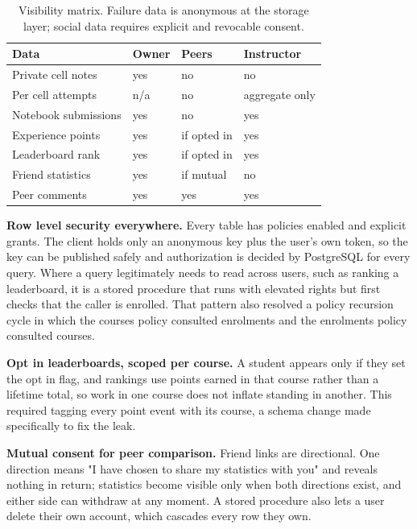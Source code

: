\documentclass[manuscript]{acmart}
\begin{document}
\begin{table}[t]
\caption{Visibility matrix. Failure data is anonymous at the storage layer;
social data requires explicit and revocable consent.}
\label{tab:visibility}
\centering\small
\begin{tabular}{@{}p{44mm}p{26mm}p{26mm}p{30mm}@{}}
\toprule
\textbf{Data} & \textbf{Owner} & \textbf{Peers} & \textbf{Instructor} \\
\midrule
Private cell notes      & yes & no & no \\
Per cell attempts       & n/a & no & aggregate only \\
Notebook submissions    & yes & no & yes \\
Experience points       & yes & if opted in & yes \\
Leaderboard rank        & yes & if opted in & yes \\
Friend statistics       & yes & if mutual & no \\
Peer comments           & yes & yes & yes \\
\bottomrule
\end{tabular}
\end{table}

\textbf{Row level security everywhere.} Every table has policies enabled and
explicit grants. The client holds only an anonymous key plus the user's own
token, so the key can be published safely and authorization is decided by
PostgreSQL for every query. Where a query legitimately needs to read across
users, such as ranking a leaderboard, it is a stored procedure that runs with
elevated rights but first checks that the caller is enrolled. That pattern also
resolved a policy recursion cycle in which the courses policy consulted
enrolments and the enrolments policy consulted courses.

\textbf{Opt in leaderboards, scoped per course.} A student appears only if they
set the opt in flag, and rankings use points earned in that course rather than
a lifetime total, so work in one course does not inflate standing in another.
This required tagging every point event with its course, a schema change made
specifically to fix the leak.

\textbf{Mutual consent for peer comparison.} Friend links are directional. One
direction means "I have chosen to share my statistics with you" and reveals
nothing in return; statistics become visible only when both directions exist,
and either side can withdraw at any moment. A stored procedure also lets a user
delete their own account, which cascades every row they own.
\end{document}
